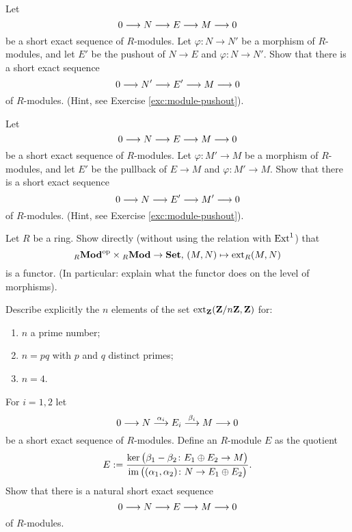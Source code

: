 \begin{exercise}
Let 
\[
	0 \longrightarrow N \longrightarrow E \longrightarrow M \longrightarrow 0
\]
be a short exact sequence of $R$-modules. Let $\varphi\colon N\to N'$ be a morphism of $R$-modules, and let $E'$ 
be the pushout of $N\to E$ and $\varphi\colon N\to N'$. Show that there is a short exact sequence
\[
	0 \longrightarrow N' \longrightarrow E' \longrightarrow M \longrightarrow 0
\]
of $R$-modules. (Hint, see Exercise \ref{exc:module-pushout}).
\end{exercise}


\begin{exercise}
Let 
\[
	0 \longrightarrow N \longrightarrow E \longrightarrow M \longrightarrow 0
\]
be a short exact sequence of $R$-modules. Let $\varphi\colon M'\to M$ be a morphism of $R$-modules, and let $E'$ 
be the pullback of $E\to M$ and $\varphi\colon M'\to M$. Show that there is a short exact sequence
\[
	0 \longrightarrow N \longrightarrow E' \longrightarrow M' \longrightarrow 0
\]
of $R$-modules. (Hint, see Exercise \ref{exc:module-pushout}).
\end{exercise}


\begin{exercise}
Let $R$ be a ring. Show directly (without using the relation with $\operatorname{Ext}^1$) that
\[
	{}_R\mathbf{Mod}^{\mathrm{op}} \times {}_R\mathbf{Mod} \to \mathbf{Set},\,
	(M,N) \mapsto \operatorname{ext}_R(M,N)
\]
is a functor. (In particular: explain what the functor does on the level of morphisms).
\end{exercise}

\begin{exercise}\label{exc:extensions-Z-mod-n}
Describe explicitly the $n$ elements of the set $\operatorname{ext}_{\mathbf{Z}}({\mathbf{Z}}/n{\mathbf{Z}},{\mathbf{Z}})$ for:
\begin{enumerate}
\item $n$ a prime number;
\item $n=pq$ with $p$ and $q$ distinct primes;
\item $n=4$.
\end{enumerate}
\end{exercise}

\begin{exercise}For $i=1,2$ let
\[
	 0 \longrightarrow N \overset{\alpha_i}{\longrightarrow} E_i \overset{\beta_i}{\longrightarrow} M \longrightarrow 0
\]
be a short exact sequence of $R$-modules. Define an $R$-module $E$ as the quotient
\[
	E := \frac{\ker \big( \beta_1 - \beta_2 \colon E_1 \oplus E_2 \to M \big)}
	{\operatorname{im} \big( (\alpha_1,\alpha_2) \colon N \to E_1 \oplus E_2 \big)}.
\]
Show that there is a natural short exact sequence
\[
	0 \longrightarrow N \longrightarrow E \longrightarrow M \longrightarrow 0
\] 
of $R$-modules.
\end{exercise}

